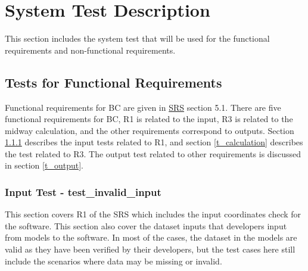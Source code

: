 \documentclass[12pt, titlepage]{article}
\begin{document}




\section{System Test Description}\label{STD}
This section includes the system test that will be used for the functional requirements and non-functional requirements.
\subsection{Tests for Functional Requirements}
Functional requirements for BC are given in \href{https://github.com/CynthiaLiu0805/BridgeCorrosion/blob/main/docs/SRS/SRS.pdf}{SRS} section 5.1. There are five functional requirements for BC, R1 is related to the input, R3 is related to the midway calculation, and the other requirements correspond to outputs. Section \ref{t_input} describes the input tests related to R1, and section \ref{t_calculation} describes the test related to R3. The output test related to other requirements is discussed in section \ref{t_output}.
\\



\subsubsection{Input Test - test\_invalid\_input}\label{t_input}
This section covers R1 of the SRS which includes the input coordinates check for the software. This section also cover the dataset inputs that developers input from models to the software. In most of the cases, the dataset in the models are valid as they have been verified by their developers, but the test cases here still include the scenarios where data may be missing or invalid.
\end{document}
